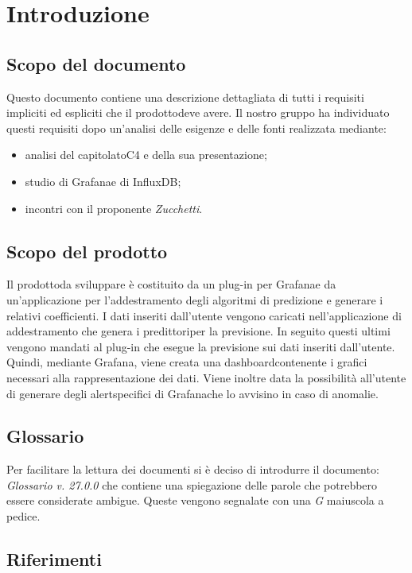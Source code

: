 \section{Introduzione}
	\subsection{Scopo del documento}
	Questo documento contiene una descrizione dettagliata di tutti i requisiti impliciti ed espliciti che il prodotto\glosp deve avere. Il nostro gruppo ha individuato questi requisiti dopo un'analisi delle esigenze e delle fonti realizzata mediante: 
	\begin{itemize}
		\item analisi del capitolato\glosp C4 e della sua presentazione; 
		\item studio di Grafana\glosp e di InfluxDB;
		\item incontri con il proponente \textit{Zucchetti}.
	\end{itemize}
	\subsection{Scopo del prodotto}
	Il prodotto\glosp da sviluppare è costituito da un plug-in per Grafana\glosp e da un'applicazione per l'addestramento degli algoritmi di predizione e generare i relativi coefficienti. I dati inseriti dall'utente vengono caricati nell'applicazione di addestramento che genera i predittori\glosp per la previsione. In seguito questi ultimi vengono mandati al plug-in che esegue la previsione sui dati inseriti dall'utente. Quindi, mediante Grafana\glo, viene creata una dashboard\glosp contenente i grafici necessari alla rappresentazione dei dati. Viene inoltre data la possibilità all'utente di generare degli alert\glosp specifici di Grafana\glosp che lo avvisino in caso di anomalie.
		
	\subsection{Glossario}
	Per facilitare la lettura dei documenti si è deciso di introdurre il documento: \textit{Glossario v. 27.0.0} che contiene una spiegazione delle parole che potrebbero essere considerate ambigue. Queste vengono segnalate con una \textit{G} maiuscola a pedice.  
	\subsection{Riferimenti}
